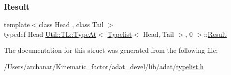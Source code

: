 \mbox{\label{structUtil_1_1TL_1_1TypeAt_3_01Typelist_3_01Head_00_01Tail_01_4_00_010_01_4_a3e1d7aaa0069c4e96cbb6bbc823fa9e8}} 
\subsubsection{\texorpdfstring{Result}{Result}\hspace{0.1cm}{\footnotesize\ttfamily [2/2]}}
{\footnotesize\ttfamily template$<$class Head , class Tail $>$ \\
typedef Head \mbox{\hyperlink{structUtil_1_1TL_1_1TypeAt}{Util\+::\+T\+L\+::\+Type\+At}}$<$ \mbox{\hyperlink{structUtil_1_1Typelist}{Typelist}}$<$ Head, Tail $>$, 0 $>$\+::\mbox{\hyperlink{structUtil_1_1TL_1_1TypeAt_3_01Typelist_3_01Head_00_01Tail_01_4_00_010_01_4_a3e1d7aaa0069c4e96cbb6bbc823fa9e8}{Result}}}



The documentation for this struct was generated from the following file\+:\begin{DoxyCompactItemize}
\item 
/\+Users/archanar/\+Kinematic\+\_\+factor/adat\+\_\+devel/lib/adat/\mbox{\hyperlink{lib_2adat_2typelist_8h}{typelist.\+h}}\end{DoxyCompactItemize}
